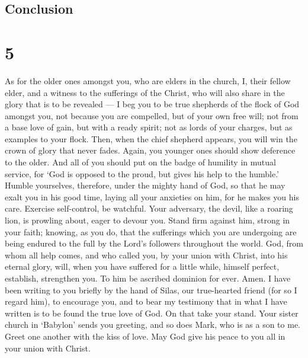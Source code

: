 \hypertarget{conclusion}{%
\subsection{Conclusion}\label{conclusion}}

\hypertarget{section-4}{%
\section{5}\label{section-4}}

 As for the older ones amongst you, who are elders in the
church, I, their fellow elder, and a witness to the sufferings of the
Christ, who will also share in the glory that is to be revealed ---
 I beg you to be true shepherds of the flock of God amongst
you, not because you are compelled, but of your own free will; not from
a base love of gain, but with a ready spirit;  not as lords
of your charges, but as examples to your flock.  Then, when
the chief shepherd appears, you will win the crown of glory that never
fades.  Again, you younger ones should show deference to the
older. And all of you should put on the badge of humility in mutual
service, for `God is opposed to the proud, but gives his help to the
humble.'  Humble yourselves, therefore, under the mighty
hand of God, so that he may exalt you in his good time, 
laying all your anxieties on him, for he makes you his care.
 Exercise self-control, be watchful. Your adversary, the
devil, like a roaring lion, is prowling about, eager to devour you.
 Stand firm against him, strong in your faith; knowing, as
you do, that the sufferings which you are undergoing are being endured
to the full by the Lord's followers throughout the world. 
God, from whom all help comes, and who called you, by your union with
Christ, into his eternal glory, will, when you have suffered for a
little while, himself perfect, establish, strengthen you. 
To him be ascribed dominion for ever. Amen.  I have been
writing to you briefly by the hand of Silas, our true-hearted friend
(for so I regard him), to encourage you, and to bear my testimony that
in what I have written is to be found the true love of God. On that take
your stand.  Your sister church in `Babylon' sends you
greeting, and so does Mark, who is as a son to me.  Greet
one another with the kiss of love. May God give his peace to you all in
your union with Christ.
